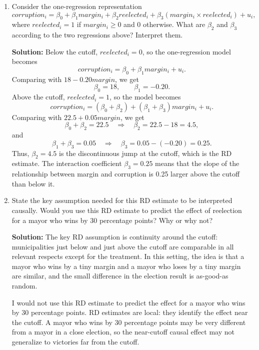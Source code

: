 \documentclass[11pt]{exam}
\begin{document}
\begin{questions}
\begin{enumerate}[leftmargin = 0.5cm, label = (\alph*), rightmargin = 0.2cm]
    \item Consider the one-regression representation
    \[
    corruption_i=\beta_0+\beta_1 margin_i+\beta_2 reelected_i+\beta_3(margin_i\times reelected_i)+u_i,
    \]
    where $reelected_i=1$ if $margin_i\geq 0$ and $0$ otherwise. What are $\beta_2$ and $\beta_3$ according to the two regressions above? Interpret them.

    \begin{solutionorbox}[8cm]
    \textbf{Solution:} Below the cutoff, $reelected_i=0$, so the one-regression model becomes
    \[
    corruption_i=\beta_0+\beta_1 margin_i+u_i.
    \]
    Comparing with $18-0.20margin$, we get
    \[
    \beta_0=18, \qquad \beta_1=-0.20.
    \]
    Above the cutoff, $reelected_i=1$, so the model becomes
    \[
    corruption_i=(\beta_0+\beta_2)+(\beta_1+\beta_3)margin_i+u_i.
    \]
    Comparing with $22.5+0.05margin$, we get
    \[
    \beta_0+\beta_2=22.5 \quad \Rightarrow \quad \beta_2=22.5-18=4.5,
    \]
    and
    \[
    \beta_1+\beta_3=0.05 \quad \Rightarrow \quad \beta_3=0.05-(-0.20)=0.25.
    \]
    Thus, $\beta_2=4.5$ is the discontinuous jump at the cutoff, which is the RD estimate. The interaction coefficient $\beta_3=0.25$ means that the slope of the relationship between margin and corruption is 0.25 larger above the cutoff than below it.
    \end{solutionorbox}

    \item State the key assumption needed for this RD estimate to be interpreted causally. Would you use this RD estimate to predict the effect of reelection for a mayor who wins by 30 percentage points? Why or why not?

    \begin{solutionorbox}[6.5cm]
    \textbf{Solution:} The key RD assumption is continuity around the cutoff: municipalities just below and just above the cutoff are comparable in all relevant respects except for the treatment. In this setting, the idea is that a mayor who wins by a tiny margin and a mayor who loses by a tiny margin are similar, and the small difference in the election result is as-good-as random.

    I would not use this RD estimate to predict the effect for a mayor who wins by 30 percentage points. RD estimates are local: they identify the effect near the cutoff. A mayor who wins by 30 percentage points may be very different from a mayor in a close election, so the near-cutoff causal effect may not generalize to victories far from the cutoff.
    \end{solutionorbox}
\end{enumerate}

\end{questions}
\end{document}
